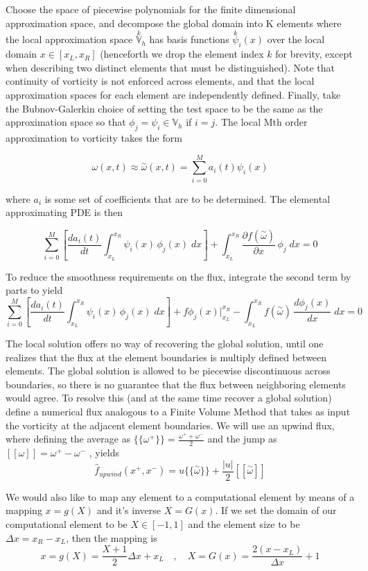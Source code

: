 \documentclass[letterpaper,12pt]{report}
\newcommand{\be}{\begin{equation}}
\newcommand{\ben}[1]{\begin{equation}\label{#1}}
\newcommand{\ee}{\end{equation}}
\newcommand{\aomega}{\overset{\sim}{\omega}}				%
\begin{document}
Choose the space of piecewise polynomials for the finite dimensional approximation space, and decompose the global domain into K elements where the local approximation space $\overset{k}{\mathbb{V}}_h$ has basis functions $\overset{k}{\psi}_i(x)$ over the local domain $x \in [x_L, x_R]$ (henceforth we drop the element index $k$ for brevity, except when describing two distinct elements that must be distinguished). Note that continuity of vorticity is not enforced across elements, and that the local approximation spaces for each element are independently defined. Finally, take the Bubnov-Galerkin choice of setting the test space to be the same as the approximation space so that $\phi_j=\psi_i \in \mathbb{V}_h$ if $i=j$. The local Mth order approximation to vorticity takes the form

\be \omega(x,t) \approx \aomega(x,t) = \sum_{i=0}^M a_i(t)\psi_i(x)\ee

where $a_i$ is some set of coefficients that are to be determined. The elemental approximating PDE is then

\be \sum_{i=0}^M \left[ \frac{d a_i(t)}{dt}\int_{x_L}^{x_R}\psi_i(x)  \, \phi_j(x) \;dx \right]
+ \int_{x_L}^{x_R} \frac{\partial f(\aomega)}{\partial x} \, \phi_j \;dx = 0 \ee

To reduce the smoothness requirements on the flux, integrate the second term by parts to yield
\ben{DGtemp} \sum_{i=0}^M \left[ \frac{d a_i(t)}{dt}\int_{x_L}^{x_R}\psi_i(x)  \, \phi_j(x) \;dx \right]
+ f\phi_j(x) \Big|^{x_R}_{x_L} 
- \int_{x_L}^{x_R} f(\aomega) \, \frac{d \phi_j(x)}{d x} \;dx = 0 \ee

The local solution offers no way of recovering the global solution, until one realizes that the flux at the element boundaries is multiply defined between elements. The global solution is allowed to be piecewise discontinuous across boundaries, so there is no guarantee that the flux between neighboring elements would agree. To resolve this (and at the same time recover a global solution) define a numerical flux analogous to a Finite Volume Method that takes as input the vorticity at the adjacent element boundaries. We will use an upwind flux, where defining the average as $\{\!\{\omega^+\}\!\} = \frac{\omega^++\omega^-}{2}$ and the jump as $[[\omega]]=\omega^+-\omega^-$ \cite{HestWar}, yields
\be \hat{f}_{upwind}(x^+,x^-)=u\{\!\{\aomega\}\!\} + \frac{|u|}{2}[[\aomega]]\ee

We would also like to map any element to a computational element by means of a mapping $x=g(X)$ and it's inverse $X=G(x)$. If we set the domain of our computational element to be $X \in [-1, 1]$ and the element size to be $\Delta x = x_R - x_L$, then the mapping is
\be x=g(X)=\frac{X+1}{2}\Delta x + x_L\quad ,\quad X=G(x)=\frac{2(x-x_L)}{\Delta x}+1 \ee
\end{document}
